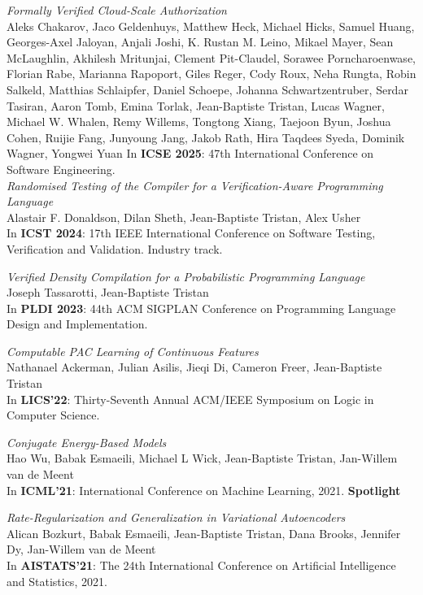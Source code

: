 \documentclass[margin,line]{res}
\begin{document}
\begin{resume}
\emph{Formally Verified Cloud-Scale Authorization}\\
Aleks Chakarov, Jaco Geldenhuys, Matthew Heck, Michael Hicks, Samuel Huang, Georges-Axel Jaloyan, Anjali Joshi, K. Rustan M. Leino, Mikael Mayer, Sean McLaughlin, Akhilesh Mritunjai, Clement Pit-Claudel, Sorawee Porncharoenwase, Florian Rabe, Marianna Rapoport, Giles Reger, Cody Roux, Neha Rungta, Robin Salkeld, Matthias Schlaipfer, Daniel Schoepe, Johanna Schwartzentruber, Serdar Tasiran, Aaron Tomb, Emina Torlak, Jean-Baptiste Tristan, Lucas Wagner, Michael W. Whalen, Remy Willems, Tongtong Xiang, Taejoon Byun, Joshua Cohen, Ruijie Fang, Junyoung Jang, Jakob Rath, Hira Taqdees Syeda, Dominik Wagner, Yongwei Yuan
In {\bf ICSE 2025}: 47th International Conference on Software Engineering.\\

\emph{Randomised Testing of the Compiler for a Verification-Aware Programming Language}\\
Alastair F. Donaldson, Dilan Sheth, Jean-Baptiste Tristan, Alex Usher\\
In {\bf ICST 2024}: 17th IEEE International Conference on Software Testing, Verification and Validation. Industry track.

\emph{Verified Density Compilation for a Probabilistic Programming Language}\\
Joseph Tassarotti, Jean-Baptiste Tristan\\
In {\bf PLDI 2023}: 44th ACM SIGPLAN Conference on Programming Language Design and Implementation.

\emph{Computable PAC Learning of Continuous Features}\\
Nathanael Ackerman, Julian Asilis, Jieqi Di, Cameron Freer, Jean-Baptiste Tristan\\
In {\bf LICS'22}: Thirty-Seventh Annual ACM/IEEE Symposium on
Logic in Computer Science.

\emph{Conjugate Energy-Based Models}\\
Hao Wu, Babak Esmaeili, Michael L Wick, Jean-Baptiste Tristan, Jan-Willem van de Meent\\
In {\bf ICML'21}: International Conference on Machine Learning, 2021. {\bf Spotlight}

\emph{Rate-Regularization and Generalization in Variational Autoencoders}\\
Alican Bozkurt, Babak Esmaeili, Jean-Baptiste Tristan, Dana Brooks, Jennifer Dy, Jan-Willem van de Meent\\
In {\bf AISTATS'21}: The 24th International Conference on
Artificial Intelligence and Statistics, 2021.


\end{resume}
\end{document}
